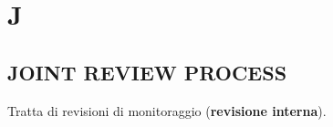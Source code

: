 \newpage
	\section{J} \label{sec:J}
	
		\subsection{JOINT REVIEW PROCESS}  \label{joint}
		Tratta di revisioni di monitoraggio (\textbf{revisione interna}).
	
	

